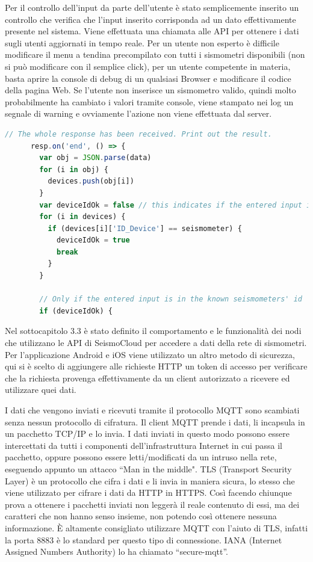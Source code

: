 \documentclass[a4paper,10pt]{memoir}
\begin{document}
Per il controllo dell'input da parte dell'utente è stato semplicemente inserito un controllo che verifica che l'input inserito corrisponda ad un dato effettivamente presente nel sistema.
Viene effettuata una chiamata alle API per ottenere i dati sugli utenti aggiornati in tempo reale.
Per un utente non esperto è difficile modificare il menu a tendina precompilato con tutti i sismometri disponibili (non si può modificare con il semplice click), per un utente competente in materia, basta aprire la console di debug di un qualsiasi Browser e modificare il codice della pagina Web.
Se l'utente non inserisce un sismometro valido, quindi molto probabilmente ha cambiato i valori tramite console, viene stampato nei log un segnale di warning e ovviamente l'azione non viene effettuata dal server.
\begin{lstlisting}[language=Javascript, firstnumber=34]
    // The whole response has been received. Print out the result.
      resp.on('end', () => {
        var obj = JSON.parse(data)
        for (i in obj) {
          devices.push(obj[i])
        }
        var deviceIdOk = false // this indicates if the entered input is in the group seismometers
        for (i in devices) {
          if (devices[i]['ID_Device'] == seismometer) {
            deviceIdOk = true
            break
          }
        }

        // Only if the entered input is in the known seismometers' id
        if (deviceIdOk) {
\end{lstlisting}

Nel sottocapitolo 3.3 è stato definito il comportamento e le funzionalità dei nodi che utilizzano le API di SeismoCloud per accedere a dati della rete di sismometri.
Per l'applicazione Android e iOS viene utilizzato un altro metodo di sicurezza, qui si è scelto di aggiungere alle richieste HTTP un token di accesso per verificare che la richiesta provenga effettivamente da un client autorizzato a ricevere ed utilizzare quei dati.

I dati che vengono inviati e ricevuti tramite il protocollo MQTT sono scambiati senza nessun protocollo di cifratura. Il client MQTT prende i dati, li incapsula in un pacchetto TCP/IP e lo invia.
I dati inviati in questo modo possono essere intercettati da tutti i componenti dell'infrastruttura Internet in cui passa il pacchetto, oppure possono essere letti/modificati da un intruso nella rete, eseguendo appunto un attacco ``Man in the middle".
TLS (Transport Security Layer) è un protocollo che cifra i dati e li invia in maniera sicura, lo stesso che viene utilizzato per cifrare i dati da HTTP in HTTPS.
Così facendo chiunque prova a ottenere i pacchetti inviati non leggerà il reale contenuto di essi, ma dei caratteri che non hanno senso insieme, non potendo così ottenere nessuna informazione.
È altamente consigliato utilizzare MQTT con l'aiuto di TLS, infatti la porta 8883 è lo standard per questo tipo di connessione. IANA (Internet Assigned Numbers Authority) lo ha chiamato  “secure-mqtt”.
\end{document}
